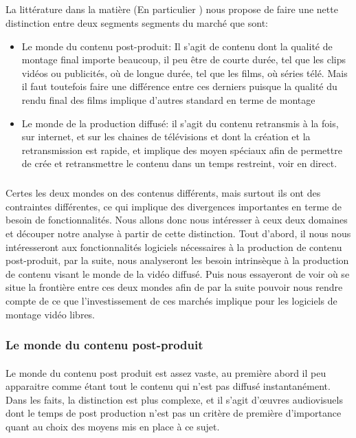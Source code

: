 \subparagraph{}
La littérature dans la matière (En particulier \cite{WorldVideoNonlinearEditingMarket})
nous propose de faire une nette distinction entre  deux segments segments du marché que sont:
\begin{itemize}
  \item {Le monde du contenu post-produit: Il s'agit de contenu dont la qualité de
    montage final importe beaucoup, il peu être de courte durée, tel que les clips
    vidéos ou publicités, où de longue durée, tel que les films, où séries télé. Mais
    il faut toutefois faire une différence entre ces derniers puisque la qualité du
    rendu final des films implique d'autres standard en terme de montage}
  \item {Le monde de la production diffusé: il s'agit du contenu retransmis à la fois,
    sur internet, et sur les chaines de télévisions et dont la création et la retransmission
    est rapide, et implique des moyen spéciaux afin de permettre de crée et retransmettre
    le contenu dans un temps restreint, voir en direct.}
\end{itemize}
\subparagraph{}
Certes les deux mondes on des contenus différents, mais surtout ils ont des contraintes différentes,
ce qui implique des divergences importantes en terme de besoin de fonctionnalités. Nous allons donc
nous intéresser à ceux deux domaines et découper notre analyse à partir de cette distinction. Tout
d'abord, il nous nous intéresseront aux fonctionnalités logiciels nécessaires à la production
de contenu post-produit, par la suite, nous analyseront les besoin intrinsèque à la production de contenu
visant le monde de la vidéo diffusé. Puis nous essayeront de voir où se situe la frontière entre ces
deux mondes afin de par la suite pouvoir nous rendre compte de ce que l'investissement de ces marchés
implique pour les logiciels de montage vidéo libres.

\subsubsection{Le monde du contenu post-produit}
\paragraph{}
Le monde du contenu post produit est assez vaste, au première abord il peu apparaitre comme étant tout le contenu
qui n'est pas diffusé instantanément. Dans les faits, la distinction est plus complexe, et il s'agit
d'œuvres audiovisuels dont le temps de post production n'est pas un critère de première d'importance
quant au choix des moyens mis en place à ce sujet.

